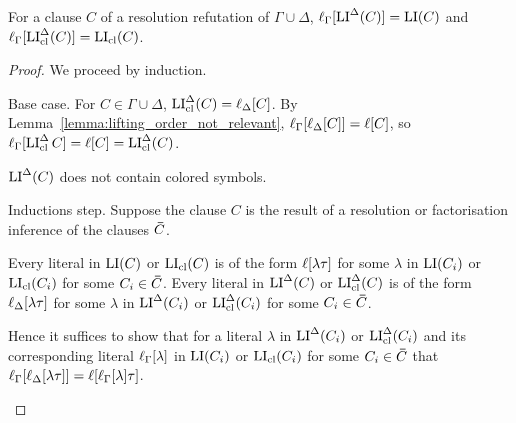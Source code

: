\documentclass[,%
	draft=false,%
	numbers=noendperiod
	11pt,
	a4paper,
	oneside,%
	openany,
]{memoir}
\begin{document}
\begin{lemma}
	\label{lemma:gamma_lifted_lide}
	For a clause $C$ of a resolution refutation of $\Gamma\cup\Delta$, 
	$\ell_{\Gamma}[\operatorname{LI}^\Delta(C)] = \operatorname{LI}(C)$ and $\ell_{\Gamma}[\operatorname{LI}_{\operatorname{cl}}^\Delta(C)] = \operatorname{LI}_{\operatorname{cl}}(C)$.
\end{lemma}
\begin{proof}
	We proceed by induction.
	\begin{description}
		\item{} Base case.
			For $C \in \Gamma\cup\Delta$, $\operatorname{LI}_{\operatorname{cl}}^\Delta(C) = \ell_{\Delta}[C]$.
			By Lemma~\ref{lemma:lifting_order_not_relevant}, $\ell_{\Gamma}[\ell_{\Delta}[C]] = \ell[C]$,
			so $\ell_{\Gamma}[\operatorname{LI}_{\operatorname{cl}}^\Delta{C}] = \ell[C] = \operatorname{LI}_{\operatorname{cl}}^\Delta(C)$.

			$\operatorname{LI}^\Delta(C)$ does not contain colored symbols.

		\item{} Inductions step.
			Suppose the clause $C$ is the result of a resolution or factorisation inference \inference{} of the clauses $\bm\bar C$.


			Every literal in $\operatorname{LI}(C)$ or $\operatorname{LI}_{\operatorname{cl}}(C)$ is of the form $\ell[\lambda\tau]$ for some $\lambda$ in $\operatorname{LI}(C_i)$ or $\operatorname{LI}_{\operatorname{cl}}(C_i)$ for some $C_i \in \bm\bar C$.
			Every literal in $\operatorname{LI}^\Delta(C)$ or $\operatorname{LI}_{\operatorname{cl}}^\Delta(C)$ is of the form $\ell_{\Delta}[\lambda\tau]$ for some $\lambda$ in $\operatorname{LI}^\Delta(C_i)$ or $\operatorname{LI}_{\operatorname{cl}}^\Delta(C_i)$ for some $C_i \in \bm\bar C$.



			Hence it suffices to show that for a literal $\lambda$ in $\operatorname{LI}^\Delta(C_i)$ or $\operatorname{LI}_{\operatorname{cl}}^\Delta(C_i)$ and its corresponding literal $\ell_{\Gamma}[\lambda]$ in $\operatorname{LI}(C_i)$ or $\operatorname{LI}_{\operatorname{cl}}(C_i)$ for some $C_i \in \bm\bar C$
			that $\ell_{\Gamma}[ \ell_{\Delta}[\lambda\tau] ] = \ell[\ell_{\Gamma}[\lambda]\tau]$.


\end{description}
\end{proof}
\end{document}
